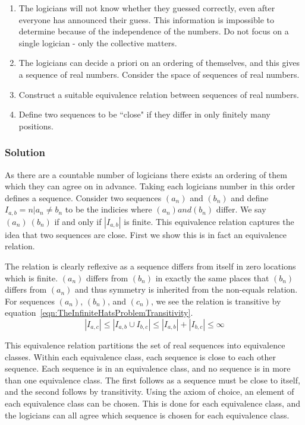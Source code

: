\begin{enumerate}
	\item The logicians will not know whether they guessed correctly, even after everyone has announced their guess. This information is impossible to determine because of the independence of the numbers. Do not focus on a single logician - only the collective matters.
	\item The logicians can decide a priori on an ordering of themselves, and this gives a sequence of real numbers. Consider the space of sequences of real numbers.
	\item Construct a suitable equivalence relation between sequences of real numbers.
	\item Define two sequences to be ``close" if they differ in only finitely many positions.
\end{enumerate}

\subsubsection{Solution}

As there are a countable number of logicians there exists an ordering of them which they can agree on in advance. Taking each logicians number in this order defines a sequence. Consider two sequences $(a_n)$ and $(b_n)$ and define $I_{a, b} = {n | a_n \neq b_n}$ to be the indicies where $(a_n) and (b_n)$ differ. We say $(a_n) ~ (b_n)$ if and only if $|I_{a, b}|$ is finite. This equivalence relation captures the idea that two sequences are close. First we show this is in fact an equivalence relation.

The relation is clearly reflexive as a sequence differs from itself in zero locations which is finite. $(a_n)$ differs from $(b_n)$ in exactly the same places that $(b_n)$ differs from $(a_n)$ and thus symmetry is inherited from the non-equals relation. For sequences $(a_n)$, $(b_n)$, and $(c_n)$, we see the relation is transitive by equation~\ref{eqn:TheInfiniteHatsProblemTransitivity}.
\begin{equation}
	|I_{a, c}| \leq |I_{a, b} \cup I_{b, c}| \leq |I_{a, b}| + |I_{b, c}| \leq \infty
	\label{eqn:TheInfiniteHatsProblemTransitivity}
\end{equation}

This equivalence relation partitions the set of real sequences into equivalence classes. Within each equivalence class, each sequence is close to each other sequence. Each sequence is in an equivalence class, and no sequence is in more than one equivalence class. The first follows as a sequence must be close to itself, and the second follows by transitivity. Using the axiom of choice, an element of each equivalence class can be chosen. This is done for each equivalence class, and the logicians can all agree which sequence is chosen for each equivalence class.

